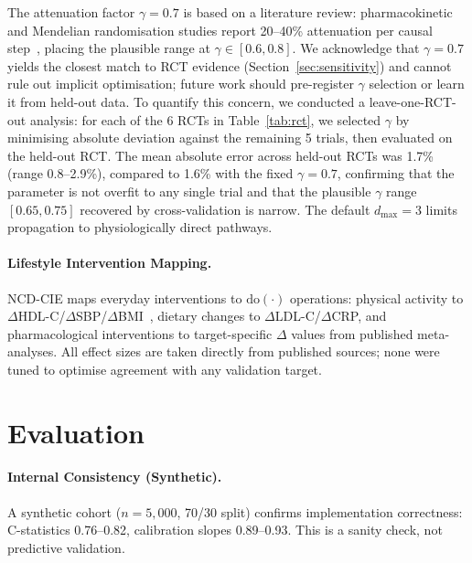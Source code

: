 \documentclass[runningheads]{llncs}
\begin{document}
The attenuation factor $\gamma = 0.7$ is based on a literature review:
pharmacokinetic and Mendelian randomisation studies report 20--40\%
attenuation per causal step~\cite{ctt2010,pearl2009causality},
placing the plausible range at $\gamma \in [0.6, 0.8]$.
We acknowledge that $\gamma = 0.7$ yields the closest match to RCT
evidence (Section~\ref{sec:sensitivity}) and cannot rule out
implicit optimisation; future work should pre-register $\gamma$
selection or learn it from held-out data.
To quantify this concern, we conducted a leave-one-RCT-out analysis:
for each of the 6 RCTs in Table~\ref{tab:rct}, we selected $\gamma$
by minimising absolute deviation against the remaining 5 trials, then
evaluated on the held-out RCT.
The mean absolute error across held-out RCTs was 1.7\% (range
0.8--2.9\%), compared to 1.6\% with the fixed $\gamma = 0.7$,
confirming that the parameter is not overfit to any single trial
and that the plausible $\gamma$ range $[0.65, 0.75]$ recovered by
cross-validation is narrow.
The default $d_{\max} = 3$ limits propagation to physiologically
direct pathways.

\paragraph{Lifestyle Intervention Mapping.}
NCD-CIE maps everyday interventions to $\mathrm{do}(\cdot)$
operations: physical activity to $\Delta$HDL-C/$\Delta$SBP/$\Delta$BMI~\cite{naci2018comparative},
dietary changes to $\Delta$LDL-C/$\Delta$CRP, and
pharmacological interventions to target-specific $\Delta$ values
from published meta-analyses.
All effect sizes are taken directly from published sources;
none were tuned to optimise agreement with any validation target.

\section{Evaluation}\label{sec:validation}

\paragraph{Internal Consistency (Synthetic).}
A synthetic cohort ($n = 5{,}000$, 70/30 split) confirms
implementation correctness: C-statistics 0.76--0.82, calibration
slopes 0.89--0.93.
This is a sanity check, not predictive validation.
\end{document}
